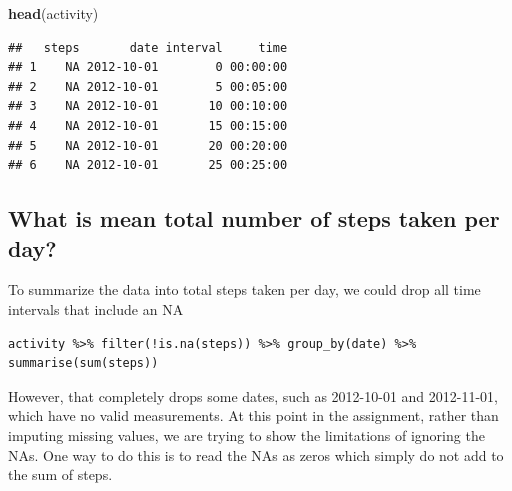 \documentclass[]{article}
\newenvironment{Shaded}{\begin{snugshade}}{\end{snugshade}}
\newcommand{\KeywordTok}[1]{\textcolor[rgb]{0.13,0.29,0.53}{\textbf{{#1}}}}
\newcommand{\DataTypeTok}[1]{\textcolor[rgb]{0.13,0.29,0.53}{{#1}}}
\newcommand{\DecValTok}[1]{\textcolor[rgb]{0.00,0.00,0.81}{{#1}}}
\newcommand{\StringTok}[1]{\textcolor[rgb]{0.31,0.60,0.02}{{#1}}}
\newcommand{\CommentTok}[1]{\textcolor[rgb]{0.56,0.35,0.01}{\textit{{#1}}}}
\newcommand{\NormalTok}[1]{{#1}}
\begin{document}
\begin{Shaded}
\begin{Highlighting}[]
\KeywordTok{head}\NormalTok{(activity)}
\end{Highlighting}
\end{Shaded}

\begin{verbatim}
##   steps       date interval     time
## 1    NA 2012-10-01        0 00:00:00
## 2    NA 2012-10-01        5 00:05:00
## 3    NA 2012-10-01       10 00:10:00
## 4    NA 2012-10-01       15 00:15:00
## 5    NA 2012-10-01       20 00:20:00
## 6    NA 2012-10-01       25 00:25:00
\end{verbatim}

\subsection{What is mean total number of steps taken per
day?}\label{what-is-mean-total-number-of-steps-taken-per-day}

To summarize the data into total steps taken per day, we could drop all
time intervals that include an NA

\begin{verbatim}
activity %>% filter(!is.na(steps)) %>% group_by(date) %>% summarise(sum(steps))
\end{verbatim}

However, that completely drops some dates, such as 2012-10-01 and
2012-11-01, which have no valid measurements. At this point in the
assignment, rather than imputing missing values, we are trying to show
the limitations of ignoring the NAs. One way to do this is to read the
NAs as zeros which simply do not add to the sum of steps.

\begin{Shaded}
\end{Shaded}
\end{document}
